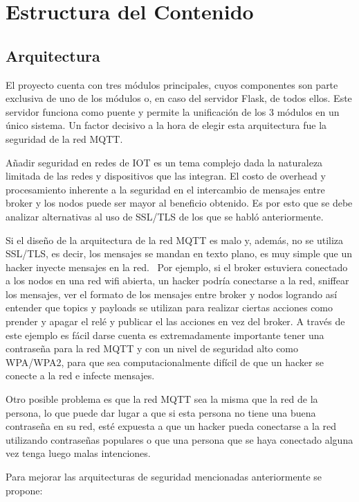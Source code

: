 \chapter{Estructura del Contenido}

\section{Arquitectura}

El proyecto cuenta con tres módulos principales, cuyos componentes son parte exclusiva de uno de los módulos o, en caso del servidor Flask, de todos ellos. Este servidor funciona como puente y permite la unificación de los 3 módulos en un único sistema. Un factor decisivo a la hora de elegir esta arquitectura fue la seguridad de la red MQTT.

Añadir seguridad en redes de IOT es un tema complejo dada la naturaleza limitada de las redes y dispositivos que las integran. El costo de overhead y procesamiento inherente a la seguridad en el intercambio de mensajes entre broker y los nodos puede ser mayor al beneficio obtenido. Es por esto que se debe analizar alternativas al uso de SSL/TLS de los que se habló anteriormente.

Si el diseño de la arquitectura de la red MQTT es malo y, además, no se utiliza SSL/TLS, es decir, los mensajes se mandan en texto plano, es muy simple que un hacker inyecte mensajes en la red.~\cite{SecurityInTheIoT} Por ejemplo, si el broker estuviera conectado a los nodos en una red wifi abierta, un hacker podría conectarse a la red, sniffear los mensajes, ver el formato de los mensajes entre broker y nodos logrando así entender que topics y payloads se utilizan para realizar ciertas acciones como prender y apagar el relé y publicar el las acciones en vez del broker. A través de este ejemplo es fácil darse cuenta es extremadamente importante tener una  contraseña para la red MQTT y con un nivel de seguridad alto como WPA/WPA2, para que sea computacionalmente difícil de que un hacker se conecte a la red e infecte mensajes.~\cite{WiFiSecurity} 

Otro posible problema es que la red MQTT sea la misma que la red de la persona, lo que puede dar lugar a que si esta persona no tiene una buena contraseña en su red, esté expuesta a que un hacker pueda conectarse a la red utilizando contraseñas populares o que una persona que se haya conectado alguna vez tenga luego malas intenciones.

Para mejorar las arquitecturas de seguridad mencionadas anteriormente se propone:

